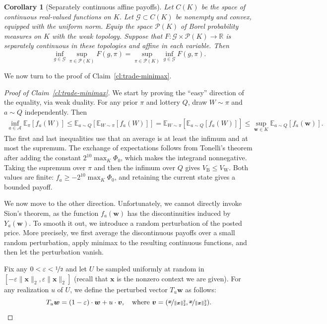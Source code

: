 \documentclass[11pt]{article}
\newtheorem{corollary}[theorem]{Corollary}
\newcommand{\Esub}[2]{\mathbb E_{#1}\left[#2\right]}
\newcommand{\R}{\mathbb R}
\newcommand{\norm}[1]{\lVert #1\rVert_2}
\newcommand{\bx}{\boldsymbol x}
\begin{document}
\begin{corollary}[Separately continuous affine payoffs]\label{cor:sion-affine}
 Let $C(K)$ be the space of continuous real-valued functions on $K$. Let $\mathcal G\subset C(K)$ be nonempty and convex, equipped with the uniform norm.
Equip the space $\mathcal P(K)$ of Borel probability measures on $K$ with the weak topology. Suppose that $F:\mathcal G\times\mathcal P(K)\to\R$ is separately continuous in these topologies and affine in each variable. Then
\[
 \inf_{g\in\mathcal G}\sup_{\pi\in\mathcal P(K)}F(g,\pi)
 =\sup_{\pi\in\mathcal P(K)}\inf_{g\in\mathcal G}F(g,\pi).
\]
\end{corollary}
We now turn to the proof of Claim~\ref{cl:trade-minimax}.
\begin{proof}[Proof of Claim~\ref{cl:trade-minimax}]
We start by proving the ``easy'' direction of the equality, via weak duality. 
For any prior $\pi$ and lottery $Q$, draw $W\sim\pi$ and $a\sim Q$ independently. Then
\[
 \begin{aligned}
 \inf_{a\in\mathcal A}\Esub{\pi}{f_a(W)}
 \le\Esub{a\sim Q}{\Esub{W\sim\pi}{f_a(W)}}=\Esub{W\sim\pi}{\Esub{a\sim Q}{f_a(W)}}
 \le\sup_{\boldsymbol w\in K}\Esub{a\sim Q}{f_a(\boldsymbol w)}.
 \end{aligned}
\]
The first and last inequalities use that an average is at least the infimum and at most the supremum. The exchange of expectations follows from Tonelli's theorem after adding the constant $2^{10}\max_K\Phi_0$, which makes the integrand nonnegative. Taking the supremum over $\pi$ and then the infimum over $Q$ gives $V_{\mathrm B}\le V_{\mathrm W}$.
Both values are finite: $f_a\ge-2^{10}\max_K\Phi_0$, and retaining the current state gives a bounded payoff.

We now move to the other direction. Unfortunately, we cannot {directly invoke} Sion's theorem, as the function $f_a(\boldsymbol w)$ {has} the discontinuities induced by $Y_a(\boldsymbol w)$. To smooth it out, we introduce a random perturbation {of the posted price}. More precisely, we first average the discontinuous payoffs over a small random perturbation, apply minimax to the resulting continuous functions, and then let the perturbation vanish. 

Fix any $0<\varepsilon<\nicefrac 12$ and let $U$ be sampled uniformly at random in $[-\varepsilon\norm{\bx},\varepsilon\norm{\bx}]$ ({recall that} $\bx$ is the {nonzero} context we are given). For any realization $u$ of $U$, we define the perturbed vector $T_u\boldsymbol w$ as follows:
\[
    T_u\boldsymbol w=(1-\varepsilon)\cdot \boldsymbol w+u\cdot \boldsymbol v, \quad \text{where } \boldsymbol v=(\nicefrac{\bx}{\norm{\bx}^2},\nicefrac{\bx}{\norm{\bx}^2}).
\]


\end{proof}
\end{document}
